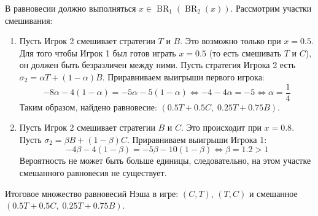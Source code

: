 \begin{example}
В равновесии должно выполняться $x \in \operatorname{BR}_1(\operatorname{BR}_2(x))$. Рассмотрим участки смешивания:
\begin{enumerate}
    \item Пусть Игрок 2 смешивает стратегии $T$ и $B$. Это возможно только при $x = 0.5$. Для того чтобы Игрок 1 был готов играть $x = 0.5$ (то есть смешивать $T$ и $C$), он должен быть безразличен между ними. Пусть стратегия Игрока 2 есть $\sigma_2 = \alpha T + (1 - \alpha)B$. Приравниваем выигрыши первого игрока:
    \begin{equation}
        -8\alpha - 4(1 - \alpha) = -5\alpha - 5(1 - \alpha) \iff -4 - 4\alpha = -5 \iff \alpha = \frac{1}{4}
    \end{equation}
    Таким образом, найдено равновесие: $\left(0.5T + 0.5C, \; 0.25T + 0.75B\right)$.
    
    \item Пусть Игрок 2 смешивает стратегии $B$ и $C$. Это происходит при $x = 0.8$. Пусть $\sigma_2 = \beta B + (1 - \beta)C$. Приравниваем выигрыши Игрока 1:
    \begin{equation}
        -4\beta - 4(1 - \beta) = -5\beta - 10(1 - \beta) \iff \beta = 1.2 > 1
    \end{equation}
    Вероятность не может быть больше единицы, следовательно, на этом участке смешанного равновесия не существует.
\end{enumerate}
Итоговое множество равновесий Нэша в игре: $(C, T)$, $(T, C)$ и смешанное $\left(0.5T + 0.5C, \; 0.25T + 0.75B\right)$.
\end{example}
